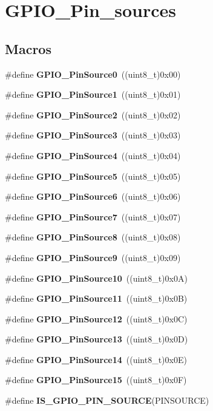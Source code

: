 \section{G\+P\+I\+O\+\_\+\+Pin\+\_\+sources}
\label{group__GPIO__Pin__sources}
\subsection*{Macros}
\begin{DoxyCompactItemize}
\item 
\#define \textbf{ G\+P\+I\+O\+\_\+\+Pin\+Source0}~((uint8\+\_\+t)0x00)
\item 
\#define \textbf{ G\+P\+I\+O\+\_\+\+Pin\+Source1}~((uint8\+\_\+t)0x01)
\item 
\#define \textbf{ G\+P\+I\+O\+\_\+\+Pin\+Source2}~((uint8\+\_\+t)0x02)
\item 
\#define \textbf{ G\+P\+I\+O\+\_\+\+Pin\+Source3}~((uint8\+\_\+t)0x03)
\item 
\#define \textbf{ G\+P\+I\+O\+\_\+\+Pin\+Source4}~((uint8\+\_\+t)0x04)
\item 
\#define \textbf{ G\+P\+I\+O\+\_\+\+Pin\+Source5}~((uint8\+\_\+t)0x05)
\item 
\#define \textbf{ G\+P\+I\+O\+\_\+\+Pin\+Source6}~((uint8\+\_\+t)0x06)
\item 
\#define \textbf{ G\+P\+I\+O\+\_\+\+Pin\+Source7}~((uint8\+\_\+t)0x07)
\item 
\#define \textbf{ G\+P\+I\+O\+\_\+\+Pin\+Source8}~((uint8\+\_\+t)0x08)
\item 
\#define \textbf{ G\+P\+I\+O\+\_\+\+Pin\+Source9}~((uint8\+\_\+t)0x09)
\item 
\#define \textbf{ G\+P\+I\+O\+\_\+\+Pin\+Source10}~((uint8\+\_\+t)0x0\+A)
\item 
\#define \textbf{ G\+P\+I\+O\+\_\+\+Pin\+Source11}~((uint8\+\_\+t)0x0\+B)
\item 
\#define \textbf{ G\+P\+I\+O\+\_\+\+Pin\+Source12}~((uint8\+\_\+t)0x0\+C)
\item 
\#define \textbf{ G\+P\+I\+O\+\_\+\+Pin\+Source13}~((uint8\+\_\+t)0x0\+D)
\item 
\#define \textbf{ G\+P\+I\+O\+\_\+\+Pin\+Source14}~((uint8\+\_\+t)0x0\+E)
\item 
\#define \textbf{ G\+P\+I\+O\+\_\+\+Pin\+Source15}~((uint8\+\_\+t)0x0\+F)
\item 
\#define \textbf{ I\+S\+\_\+\+G\+P\+I\+O\+\_\+\+P\+I\+N\+\_\+\+S\+O\+U\+R\+CE}(P\+I\+N\+S\+O\+U\+R\+CE)
\end{DoxyCompactItemize}


